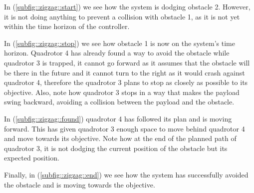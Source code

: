 In (\ref{subfig::zigzag::start}) we see how the system is dodging obstacle 2. However, it is not doing anything to prevent a collision with obstacle 1, as it is not yet within the time horizon of the controller. 

In (\ref{subfig::zigzag::stop}) we see how obstacle 1 is now on the system's time horizon. Quadrotor 4 has already found a way to avoid the obstacle while quadrotor 3 is trapped, it cannot go forward as it assumes that the obstacle will be there in the future and it cannot turn to the right as it would crash against quadrotor 4, therefore the quadrotor 3 plans to stop as closely as possible to its objective. Also, note how quadrotor 3 stops in a way that makes the payload swing backward, avoiding a collision between the payload and the obstacle.

In (\ref{subfig::zigzag::found}) quadrotor 4 has followed its plan and is moving forward. This has given quadrotor 3 enough space to move behind quadrotor 4 and move towards its objective. Note how at the end of the planned path of quadrotor 3, it is not dodging the current position of the obstacle but its expected position.

Finally, in (\ref{subfig::zigzag::end}) we see how the system has successfully avoided the obstacle and is moving towards the objective.

